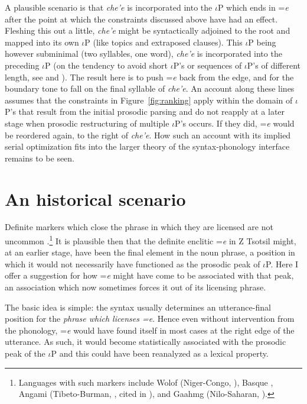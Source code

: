 \documentclass[output=paper,
modfonts
]{LSP/langsci}
\begin{document}
A plausible scenario is that \emph{che'e} is incorporated into the $\iota$P which ends in =\emph{e} after the point
at which the constraints discussed above have had an effect.
Fleshing this out a little, \emph{che'e} might be syntactically adjoined to the root and mapped into its own $\iota$P (like topics and
extraposed clauses). This $\iota$P being however subminimal (two syllables, one word), \emph{che'e} is incorporated into the preceding $\iota$P
(on the tendency to avoid short $\iota$P's or sequences of $\iota$P's of different length, see \citealt{nesporvogel1986} and \citealt{dehe2009}).
 The result here is to push =\emph{e} back from the edge, and for the boundary tone to fall on the final syllable of \emph{che'e}.  
 An account along these lines assumes
 that the constraints in Figure~\ref{fig:ranking} apply within the domain of  $\iota$P's that result from the initial 
 prosodic parsing and do not reapply at a later stage when prosodic restructuring of multiple $\iota$P's occurs.
 If they did, =\emph{e} would be reordered again, to the right of \emph{che'e}. How such an account with
 its implied serial optimization fits into the larger theory of the syntax-phonology interface remains to be seen.

\section{An historical scenario}
Definite markers which close the phrase in which they are licensed are not uncommon \citep{wals-37}.\footnote
{Languages with such markers include Wolof (Niger-Congo,  \citealt{torrence2013}), Basque \citep{laka1996}, Angami (Tibeto-Burman, \citealt{Giridhar-1980}, cited in \citealt{wals-37}), and Gaahmg (Nilo-Saharan, \citealt{stirtz2012}).
} 
  It is plausible then that the definite enclitic =\emph{e} in Z Tsotsil might, at an earlier stage, have been the final element in the noun
  phrase, a position in which it would not necessarily have functioned as the prosodic peak of $\iota$P.
  Here I offer a suggestion for how =\emph{e} might have come to be associated with that peak, an association
  which now sometimes forces it out of its licensing phrase.
 
The basic idea is simple:  the syntax usually determines an utterance-final position 
for the \emph{phrase which licenses =\emph{e}}. Hence even without intervention from the phonology,  
=\emph{e} would have found itself in most cases at the right edge of the utterance.
As such, it would become statistically associated with the prosodic peak of the $\iota$P 
 and this could have been reanalyzed as a lexical property.  
\end{document}
